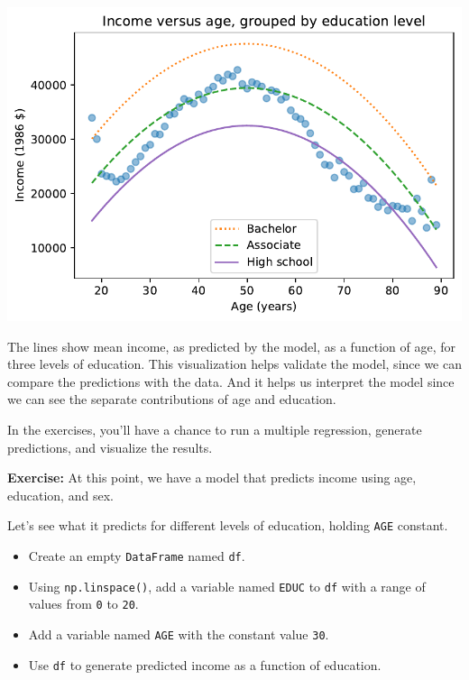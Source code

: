 \begin{center}
\includegraphics[scale=0.75]{10_regression_files/10_regression_56_0.pdf}
\end{center}

The lines show mean income, as predicted by the model, as a function of
age, for three levels of education. This visualization helps validate
the model, since we can compare the predictions with the data. And it
helps us interpret the model since we can see the separate contributions
of age and education.

In the exercises, you'll have a chance to run a multiple regression,
generate predictions, and visualize the results.

\textbf{Exercise:} At this point, we have a model that predicts income
using age, education, and sex.

Let's see what it predicts for different levels of education, holding
\passthrough{\lstinline!AGE!} constant.

\begin{itemize}
\item
  Create an empty \passthrough{\lstinline!DataFrame!} named
  \passthrough{\lstinline!df!}.
\item
  Using \passthrough{\lstinline!np.linspace()!}, add a variable named
  \passthrough{\lstinline!EDUC!} to \passthrough{\lstinline!df!} with a
  range of values from \passthrough{\lstinline!0!} to
  \passthrough{\lstinline!20!}.
\item
  Add a variable named \passthrough{\lstinline!AGE!} with the constant
  value \passthrough{\lstinline!30!}.
\item
  Use \passthrough{\lstinline!df!} to generate predicted income as a
  function of education.
\end{itemize}

